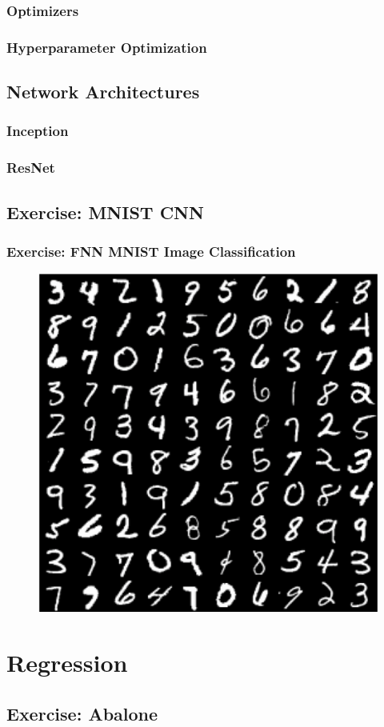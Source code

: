 \documentclass[aspectratio=169]{beamer}
\begin{document}
\begin{frame}
\frametitle{Optimizers}
\end{frame}

\begin{frame}
\frametitle{Hyperparameter Optimization}
\end{frame}

\subsection{Network Architectures}
\label{subsec:network-architectures}

\begin{frame}
\frametitle{Inception}
\end{frame}

\begin{frame}
\frametitle{ResNet}
\end{frame}

\subsection{Exercise: MNIST CNN}
\label{subsec:cnn-exercise}

\begin{frame}
\frametitle{Exercise: FNN MNIST Image Classification}

\begin{figure}
    \centering
    \includegraphics[width=0.4\linewidth]{mnist.png}
\end{figure}
\end{frame}

\section{Regression}
\label{sec:regression}

\subsection{Exercise: Abalone}
\label{subsec:regression-exercise}
\end{document}
